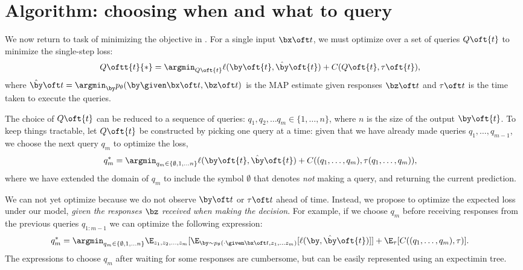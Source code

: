 \section{Algorithm: choosing when and what to query}
\label{sec:async}

We now return to task of minimizing the objective in .
For a single input $\bx\oft t$, we must optimize over a set of queries $Q\oft{t}$ to minimize the single-step loss:
\begin{align*}
  Q\oftt{t}{*} &= \argmin_{Q\oft{t}} \ell(\by\oft{t}, \byt\oft{t}) + C(Q\oft{t}, \tau\oft{t}),
\end{align*}
where $\byt\oft t = \argmin_{\by} \p(\by \given \bx \oft t, \bz\oft t)$ is the MAP estimate given responses $\bz\oft t$ and $\tau\oft t$ is the time taken to execute the queries.

The choice of $Q\oft{t}$ can be reduced to a sequence of queries: $q_1, q_2, \ldots q_m \in \{1, \ldots, n\}$, where $n$ is the size of the output $\by\oft{t}$.
To keep things tractable, let $Q\oft{t}$ be constructed by picking one query at a time:
given that we have already made queries $q_1, \ldots, q_{m-1}$, we choose the next query $q_m$ to optimize the loss,
\begin{align}
  q_m^* &= \argmin_{q_m \in \{\emptyset, 1, \ldots n\}} \ell(\by\oft{t}, \byt\oft{t}) + C((q_1, \ldots, q_m), \tau(q_1, \ldots, q_m)), \label{eqn:one-step-q}
\end{align}
where we have extended the domain of $q_m$ to include the symbol $\emptyset$ that denotes {\em not\/} making a query, and returning the current prediction.

We can not yet optimize  because we do not observe $\by\oft t$ or $\tau\oft t$ ahead of time.
Instead, we propose to optimize the expected loss under our model, {\em given the responses $\bz$ received when making the decision}.
For example, if we choose $q_m$ before receiving responses from the previous queries $q_{1:m-1}$ we can optimize the following expression:
\begin{align}
  q_m^* &= \argmin_{q_m \in \{\emptyset, 1, \ldots n\}} 
  \E_{z_1, z_2, \ldots, z_{m}}[\E_{\by \sim \p(\cdot \given \bx\oft t, z_1, \ldots z_m)}[\ell(\by, \byt\oft{t})]] + \E_{\tau}[C((q_1, \ldots, q_m), \tau)]. \label{eqn:cumbersome}
\end{align}
The expressions to choose $q_m$ after waiting for some responses are cumbersome, but can be easily represented using an expectimin tree.

